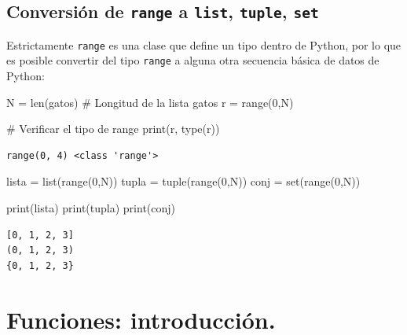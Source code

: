 \documentclass[
  spanish,
  letterpaper,
]{scrbook}
\newenvironment{Shaded}{\begin{snugshade}}{\end{snugshade}}
\newcommand{\BuiltInTok}[1]{\textcolor[rgb]{0.00,0.23,0.31}{#1}}
\newcommand{\CommentTok}[1]{\textcolor[rgb]{0.37,0.37,0.37}{#1}}
\newcommand{\DecValTok}[1]{\textcolor[rgb]{0.68,0.00,0.00}{#1}}
\newcommand{\NormalTok}[1]{\textcolor[rgb]{0.00,0.23,0.31}{#1}}
\newcommand{\OperatorTok}[1]{\textcolor[rgb]{0.37,0.37,0.37}{#1}}
\theoremstyle{definition}
\theoremstyle{remark}
\begin{document}
\section{\texorpdfstring{Conversión de \texttt{range} a \texttt{list},
\texttt{tuple},
\texttt{set}}{Conversión de range a list, tuple, set}}\label{conversiuxf3n-de-range-a-list-tuple-set}

Estrictamente \texttt{range} es una clase que define un tipo dentro de
Python, por lo que es posible convertir del tipo \texttt{range} a alguna
otra secuencia básica de datos de Python:

\begin{Shaded}
\begin{Highlighting}[]
\NormalTok{N }\OperatorTok{=} \BuiltInTok{len}\NormalTok{(gatos) }\CommentTok{\# Longitud de la lista gatos}
\NormalTok{r }\OperatorTok{=} \BuiltInTok{range}\NormalTok{(}\DecValTok{0}\NormalTok{,N)}

\CommentTok{\# Verificar el tipo de range}
\BuiltInTok{print}\NormalTok{(r, }\BuiltInTok{type}\NormalTok{(r))}
\end{Highlighting}
\end{Shaded}

\begin{verbatim}
range(0, 4) <class 'range'>
\end{verbatim}

\begin{Shaded}
\begin{Highlighting}[]
\NormalTok{lista }\OperatorTok{=} \BuiltInTok{list}\NormalTok{(}\BuiltInTok{range}\NormalTok{(}\DecValTok{0}\NormalTok{,N))}
\NormalTok{tupla }\OperatorTok{=} \BuiltInTok{tuple}\NormalTok{(}\BuiltInTok{range}\NormalTok{(}\DecValTok{0}\NormalTok{,N))}
\NormalTok{conj }\OperatorTok{=} \BuiltInTok{set}\NormalTok{(}\BuiltInTok{range}\NormalTok{(}\DecValTok{0}\NormalTok{,N))}

\BuiltInTok{print}\NormalTok{(lista)}
\BuiltInTok{print}\NormalTok{(tupla)}
\BuiltInTok{print}\NormalTok{(conj)}
\end{Highlighting}
\end{Shaded}

\begin{verbatim}
[0, 1, 2, 3]
(0, 1, 2, 3)
{0, 1, 2, 3}
\end{verbatim}

\chapter{Funciones: introducción.}\label{sec-o-funciones-intro}
\end{document}
